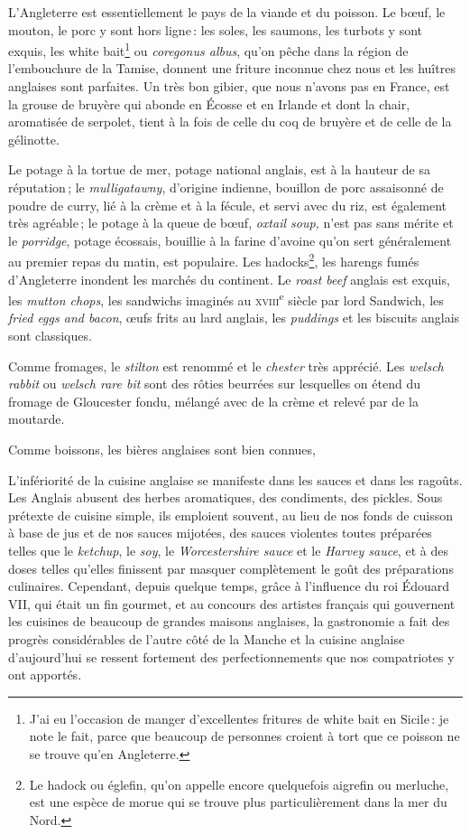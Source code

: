 L'Angleterre est essentiellement le pays de la viande et du poisson. Le bœuf,
le mouton, le porc y sont hors ligne : les soles, les saumons, les turbots
y sont exquis, les white bait\footnote{J'ai eu l'occasion de manger
d'excellentes fritures de white bait en Sicile : je note le fait, parce que
beaucoup de personnes croient à tort que ce poisson ne se trouve qu'en
Angleterre.} ou \textit{coregonus albus}, qu'on pêche dans la région de
l'embouchure de la Tamise, donnent une friture inconnue chez nous et les
huîtres anglaises sont parfaites. Un très bon gibier, que nous n'avons pas en
France, est la grouse de bruyère qui abonde en Écosse et en Irlande et dont la
chair, aromatisée de serpolet, tient à la fois de celle du coq de bruyère et de
celle de la gélinotte.

Le potage à la tortue de mer, potage national anglais, est à la hauteur de sa
réputation ; le \textit{mulligatawny}, d'origine indienne, bouillon de porc
assaisonné de poudre de curry, lié à la crème et à la fécule, et servi avec du
riz, est également très agréable ; le potage à la queue de bœuf, \textit{oxtail
soup,} n'est pas sans mérite et le \textit{porridge}, potage écossais, bouillie
à la farine d'avoine qu'on sert généralement au premier repas du matin, est
populaire. Les hadocks\footnote{Le hadock ou églefin, qu'on appelle encore
quelquefois aigrefin ou merluche, est une espèce de morue qui se trouve plus
particulièrement dans la mer du Nord.}, les harengs fumés d'Angleterre inondent
les marchés du continent. Le \textit{roast beef} anglais est exquis, les
\textit{mutton chops}, les sandwichs imaginés au
\textsc{xviii}\textsuperscript{e} siècle par lord Sandwich, les \textit{fried
eggs and bacon}, œufs frits au lard anglais, les \textit{puddings} et les
biscuits anglais sont classiques.

Comme fromages, le \textit{stilton} est renommé et le \textit{chester} très
apprécié. Les \textit{welsch rabbit} ou \textit{welsch rare bit} sont des
rôties beurrées sur lesquelles on étend du fromage de Gloucester fondu, mélangé
avec de la crème et relevé par de la moutarde.

Comme boissons, les bières anglaises sont bien connues,

L'infériorité de la cuisine anglaise se manifeste dans les sauces et dans les
ragoûts. Les Anglais abusent des herbes aromatiques, des condiments, des
pickles. Sous prétexte de cuisine simple, ils emploient souvent, au lieu de nos
fonds de cuisson à base de jus et de nos sauces mijotées, des sauces violentes
toutes préparées telles que le \textit{ketchup}, le \textit{soy}, le
\textit{Worcestershire sauce} et le \textit{Harvey sauce}, et à des doses
telles qu'elles finissent par masquer complètement le goût des préparations
culinaires. Cependant, depuis quelque temps, grâce à l'influence du roi Édouard
VII, qui était un fin gourmet, et au concours des artistes français qui
gouvernent les cuisines de beaucoup de grandes maisons anglaises, la
gastronomie a fait des progrès considérables de l'autre côté de la Manche et la
cuisine anglaise d'aujourd'hui se ressent fortement des perfectionnements que
nos compatriotes y ont apportés.

